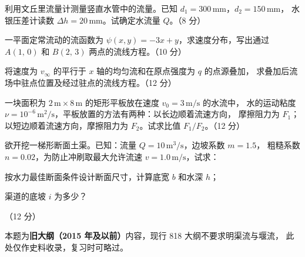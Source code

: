 \begin{ti}
  \item 利用文丘里流量计测量竖直水管中的流量。已知 $d_1=300\,\mathrm{mm}$，$d_2=150\,\mathrm{mm}$，
  水银压差计读数 $\Delta h=20\,\mathrm{mm}$。试确定水流量 $Q$。（8 分）\hfill{}

  \item 一平面定常流动的流函数为 $\psi(x,y)=-3x+y$，求速度分布，写出通过 $A(1,\,0)$
  和 $B(2,\,3)$ 两点的流线方程。（10 分）\hfill{}

  \item 将速度为 $v_\infty$ 的平行于 $x$ 轴的均匀流和在原点强度为 $q$ 的点源叠加，
  求叠加后流场中驻点位置及经过驻点的流线方程。（12 分）\hfill{}

  \item 一块面积为 $2\,\mathrm{m}\times8\,\mathrm{m}$ 的矩形平板放在速度 $v_0=3\,\mathrm{m/s}$ 的水流中，
  水的运动粘度 $\nu=10^{-6}\,\mathrm{m^2/s}$，平板放置的方法有两种：以长边顺着流速方向，
  摩擦阻力为 $F_1$；以短边顺着流速方向，摩擦阻力为 $F_2$。试求比值 $F_1/F_2$。（12 分）
  \hfill{}

  \item 欲开挖一梯形断面土渠。已知：流量 $Q=10\,\mathrm{m^3/s}$，边坡系数 $m=1.5$，
  粗糙系数 $n=0.02$，为防止冲刷取最大允许流速 $v=1.0\,\mathrm{m/s}$，试求：
  \begin{xiaowen}
    \item 按水力最佳断面条件设计断面尺寸，计算底宽 $b$ 和水深 $h$；
    \item 渠道的底坡 $i$ 为多少？
  \end{xiaowen}
  （12 分）\hfill{}
  \begin{tishi}
  本题为\textbf{旧大纲（2015 年及以前）}内容，现行 818 大纲不要求明渠流与堰流，
  此处仅作史料收录，复习时可略过。
  \end{tishi}
\end{ti}
